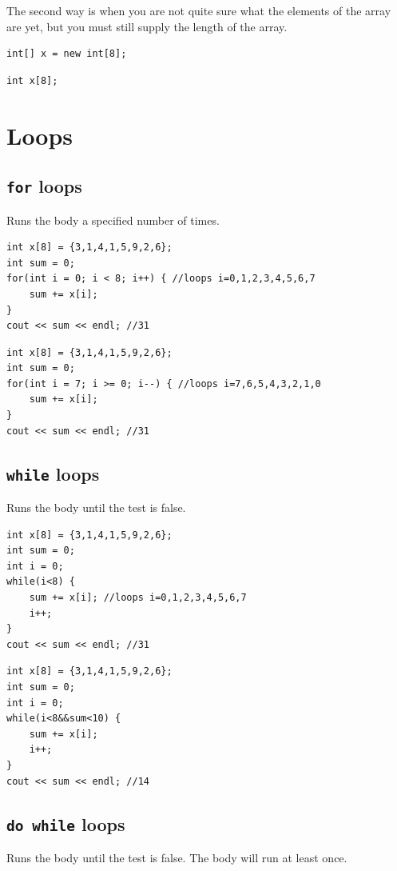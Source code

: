 The second way is when you are not quite sure what the elements of the array are yet, but you must still supply the length of the array.

\if{}
\begin{lstlisting}
int[] x = new int[8];
\end{lstlisting}
\else
\begin{lstlisting}
int x[8];
\end{lstlisting}
\fi


\section{Loops}
\subsection{\texttt{for} loops}
Runs the body a specified number of times.

\begin{lstlisting}
int x[8] = {3,1,4,1,5,9,2,6};
int sum = 0;
for(int i = 0; i < 8; i++) { //loops i=0,1,2,3,4,5,6,7
    sum += x[i];
}
cout << sum << endl; //31
\end{lstlisting}

\begin{lstlisting}
int x[8] = {3,1,4,1,5,9,2,6};
int sum = 0;
for(int i = 7; i >= 0; i--) { //loops i=7,6,5,4,3,2,1,0
    sum += x[i];
}
cout << sum << endl; //31
\end{lstlisting}

\subsection{\texttt{while} loops}
Runs the body until the test is false.
\begin{lstlisting}
int x[8] = {3,1,4,1,5,9,2,6};
int sum = 0;
int i = 0;
while(i<8) { 
    sum += x[i]; //loops i=0,1,2,3,4,5,6,7
    i++;
}
cout << sum << endl; //31
\end{lstlisting}

\begin{lstlisting}
int x[8] = {3,1,4,1,5,9,2,6};
int sum = 0;
int i = 0;
while(i<8&&sum<10) { 
    sum += x[i];
    i++;
}
cout << sum << endl; //14
\end{lstlisting}

\subsection{\texttt{do while} loops}
Runs the body until the test is false. The body will run at least once.

